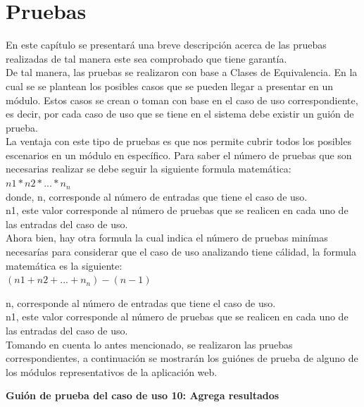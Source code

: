 \chapter{Pruebas}

	\noindent En este capítulo se presentará una breve descripción acerca de las pruebas realizadas de tal manera este sea comprobado que tiene garantía. \\
	
	\noindent De tal manera, las pruebas se realizaron con base a Clases de Equivalencia. En la cual se se plantean los posibles casos que se pueden llegar a presentar en un módulo. Estos casos se crean o toman con base en el caso de uso correspondiente, es decir, por cada caso de uso que se tiene en el sistema debe existir un guión de prueba.\\
	
	\noindent La ventaja con este tipo de pruebas es que nos permite cubrir todos los posibles escenarios en un módulo en específico. Para saber el número de pruebas que son necesarias realizar se debe seguir la siguiente formula matemática:\\
	$ n1 * n2 * ... * n_{n} $ \\
	donde, 
	n, corresponde al número de entradas que tiene el caso de uso.\\
	n1, este valor corresponde al número de pruebas que se realicen en cada uno de las entradas del caso de uso.\\
	
	\noindent Ahora bien, hay otra formula la cual indica el número de pruebas minímas necesarías para considerar que el caso de uso analizando tiene cálidad, la formula matemática es la siguiente: \\
	
	$ (n1 + n2 + ... + n_{n}) - (n - 1) $
	
	n, corresponde al número de entradas que tiene el caso de uso.\\
	n1, este valor corresponde al número de pruebas que se realicen en cada uno de las entradas del caso de uso.\\
	
	\noindent Tomando en cuenta lo antes mencionado, se realizaron las pruebas correspondientes, a continuación se mostrarán los guiónes de prueba de alguno de los módulos representativos de la aplicación web.\\
	\pagebreak
	
	\textbf{Guión de prueba del caso de uso 10: Agrega resultados}
	
